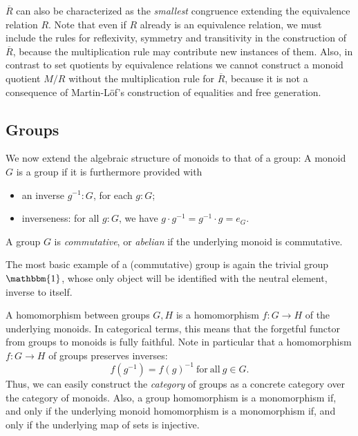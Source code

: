 \documentclass{amsart}
\theoremstyle{plain}
\numberwithin{equation}{section} %
\numberwithin{figure}{section} %
\theoremstyle{plain}
\theoremstyle{plain}
\theoremstyle{plain}
\theoremstyle{plain}
\theoremstyle{plain}
\theoremstyle{plain}
\theoremstyle{remark}
\theoremstyle{remark}
\theoremstyle{remark}
\begin{document}
$\overline{R}$ can also be characterized as the \textit{smallest} congruence extending the equivalence relation $R$. 
Note that even if $R$ already is an equivalence relation, we must include the rules for reflexivity, symmetry and transitivity in the construction of $\overline{R}$, because the multiplication rule may contribute new instances of them. Also,
in contrast to set quotients by equivalence relations we cannot construct a monoid quotient $M/R$ without the multiplication rule for $\overline{R}$, because it is not a consequence of Martin-L\"of's construction of equalities and free generation.


\subsection{Groups}  \label{groups-ssec}

We now extend the algebraic structure of monoids to that of a group: A monoid $G$ is a group if it is furthermore provided with
\begin{itemize}
\item an inverse $g^{-1} : G$, for each $g : G$;
\item inverseness: for all $g : G$, we have $g \cdot g^{-1} = g^{-1} \cdot g = e_G$.
\end{itemize}

A group $G$ is \textit{commutative}, or \textit{abelian} if the underlying monoid is commutative.

The most basic example of a (commutative) group is again the trivial group $\mathbbm{1}$, whose only object will be identified with the neutral element, inverse to itself.

A homomorphism between groups $G, H$ is a homomorphism $f : G \rightarrow H$ of the underlying monoids. In categorical terms, this means that the forgetful functor from groups to monoids is fully faithful.
Note in particular that a homomorphism $f : G \rightarrow H$ of groups preserves inverses:
\[ f(g^{-1}) = f(g)^{-1}\ \mathrm{for\ all\ } g \in G. \]
Thus, we can easily construct the \textit{category} of groups as a concrete category over the category of monoids.
Also, a group homomorphism is a monomorphism if, and only if the underlying monoid homomorphism is a monomorphism if, and only if the underlying map of sets is injective.
\end{document}
